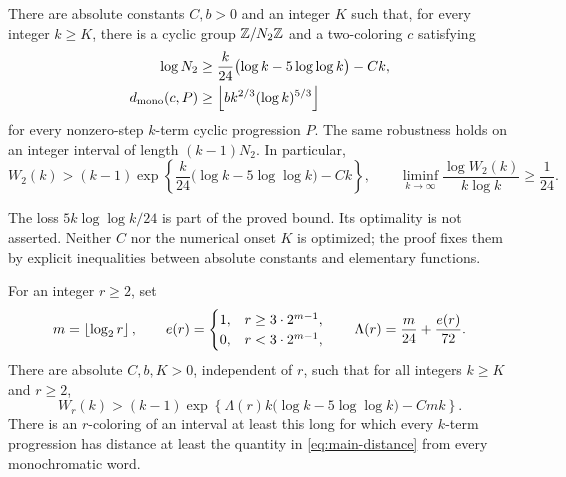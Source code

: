 \begin{theorem}\label{thm:main-two}
There are absolute constants \(C,b>0\) and an integer \(K\) such that,
for every integer \(k\ge K\), there is a cyclic group \(\mathbb Z/N_2\mathbb Z\) and
a two-coloring \(c\) satisfying
\begin{align}
 \log N_2&\ge
 \frac{k}{24}\bigl(\log k-5\log\log k\bigr)-Ck,
 \label{eq:main-two-size}\\
 d_{\rm mono}(c,P)&\ge
 \left\lfloor b k^{2/3}(\log k)^{5/3}\right\rfloor
 \label{eq:main-distance}
\end{align}
for every nonzero-step \(k\)-term cyclic progression \(P\).
The same robustness holds on an integer interval of length
\((k-1)N_2\). In particular,
\[
 W_2(k)>(k-1)
 \exp\!\left\{\frac{k}{24}
       \bigl(\log k-5\log\log k\bigr)-Ck\right\},
 \qquad
 \liminf_{k\to\infty}\frac{\log W_2(k)}{k\log k}\ge\frac1{24}.
\]
\end{theorem}

The loss \(5k\log\log k/24\) is part of the proved bound. Its optimality
is not asserted. Neither \(C\) nor the numerical onset \(K\) is optimized;
the proof fixes them by explicit inequalities between absolute
constants and elementary functions.

\begin{theorem}\label{thm:main-many}
For an integer \(r\ge2\), set
\begin{equation}\label{eq:palette-coefficient}
 m=\left\lfloor \log_2 r\right\rfloor,\qquad
 e(r)=
 \begin{cases}
 1,&r\ge3\cdot2^{m-1},\\
 0,&r<3\cdot2^{m-1},
 \end{cases}
 \qquad
 \Lambda(r)=\frac{m}{24}+\frac{e(r)}{72}.
\end{equation}
There are absolute \(C,b,K>0\), independent of \(r\), such that
for all integers \(k\ge K\) and \(r\ge2\),
\begin{equation}\label{eq:main-many}
 W_r(k)>(k-1)\exp\!\left\{
 \Lambda(r)k\bigl(\log k-5\log\log k\bigr)-Cmk
 \right\}.
\end{equation}
There is an \(r\)-coloring of an interval at least this long for which
every \(k\)-term progression has distance at least the quantity in
\eqref{eq:main-distance} from every monochromatic word.
\end{theorem}

